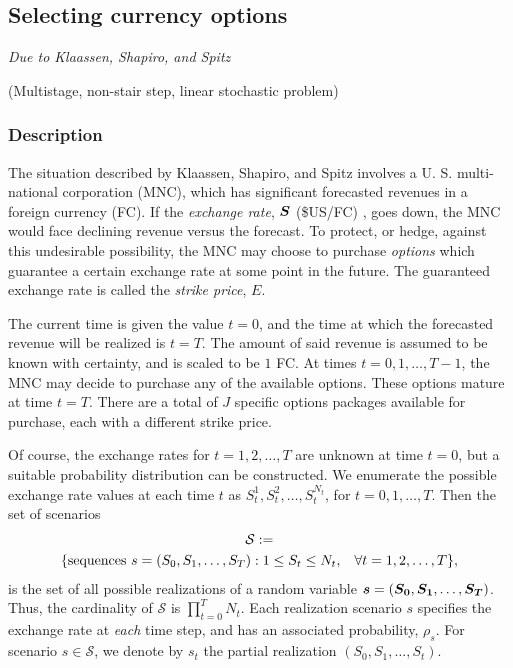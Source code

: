 \subsection{Selecting currency options}%
\emph{Due to Klaassen, Shapiro, and Spitz \cite{klaassen90}}%

\noindent(Multistage, non-stair step, linear stochastic problem)

\vspace{3mm}
\subsubsection{Description}

The situation described by Klaassen, Shapiro, and Spitz \cite{klaassen90} involves a U. S. multi-national corporation (MNC), which has significant forecasted revenues in a foreign currency (FC).  If the \emph{exchange rate}, $\mathbf{\boldsymbol{S}}$ (\$US/FC)%
, goes down, the MNC would face declining revenue versus the forecast.  To protect, or hedge, against this undesirable possibility, the MNC may choose to purchase \emph{options} which guarantee a certain exchange rate at some point in the future.  The guaranteed exchange rate is called the \emph{strike price}, $E$.

The current time is given the value $t=0$, and the time at which the forecasted revenue will be realized is $t=T$.  The amount of said revenue is assumed to be known with certainty, and is scaled to be $1$ FC.  At times $t=0,1,  \ldots, T-1$, the MNC may decide to purchase any of the available options.  These options mature at time $t=T$.  There are a total of $J$ specific options packages available for purchase, each with a different strike price.

Of course, the exchange rates for $t=1,2,\ldots,T$ are unknown at time $t=0$, but a suitable probability distribution can be constructed.  We enumerate the possible exchange rate values at each time $t$ as $S_t^1, S_t^2,\ldots,S_t^{N_t}$, for $t=0,1,\ldots,T$.  Then the set of scenarios
\begin{multline*}
\mathcal{S} := \\
\{\mbox{sequences } s=(S_0,S_1,\ldots,S_T): 1\leq S_t\leq N_t, \hspace{3mm}\forall t=1, 2, \ldots, T\},
\end{multline*}
is the set of all possible realizations of a random variable $\mathbf{\boldsymbol{s}} = (\mathbf{\boldsymbol{S_0}},\mathbf{\boldsymbol{S_1}},\ldots,\mathbf{\boldsymbol{S_T}})$.
Thus, the cardinality of $\mathcal{S}$ is $\prod_{t=0}^T N_t$.  Each realization scenario $s$ specifies the exchange rate at \emph{each} time step, and has an associated probability, $\rho_s$.  For scenario $s \in \mathcal{S}$, we denote by $s_t$ the partial realization $(S_0,S_1, \ldots, S_t)$.

